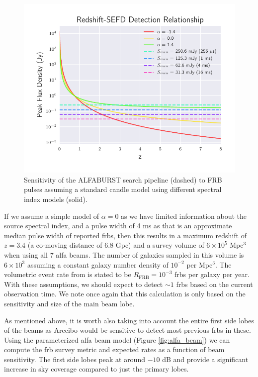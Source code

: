\documentclass[a4paper,fleqn,usenatbib]{mnras}
\begin{document}
\begin{figure}
    \includegraphics[width=1.0\linewidth]{figures/fwhm_sefd_z_relation.pdf}
    \caption{Sensitivity of the ALFABURST search pipeline (dashed) to FRB pulses
    assuming a standard candle model using different spectral index models
    (solid).
    }
    \label{fig:fwhm_sefd_z}
\end{figure}

If we assume a simple model of $\alpha=0$ as we have limited
information about the source spectral index, and a pulse width of 4 ms
as that is an approximate median pulse width of reported \glspl{frb},
then this results in a maximum redshift of $z=3.4$ (a co-moving
distance of 6.8 Gpc) and a survey volume of $6 \times 10^5$ Mpc$^3$
when using all 7 \gls{alfa} beams. The number of galaxies sampled in
this volume is $6 \times 10^3$ assuming a constant galaxy number
density of $10^{-2}$ per Mpc$^3$.  The volumetric event rate from
\cite{2013Sci...341...53T} is stated to be $R_{\textrm{FRB}} =
10^{-3}$ \glspl{frb} per galaxy per year. With these assumptions, we
should expect to detect $\sim 1$ \glspl{frb} based on the current
observation time. We note once again that this calculation is only
based on the sensitivity and size of the main beam lobe.

As mentioned above, it is worth also taking into account the entire
first side lobes of the beams as Arecibo would be sensitive to detect
most previous \glspl{frb} in these. Using the parameterized \gls{alfa}
beam model (Figure \ref{fig:alfa_beam}) \citep{GALFAbeam} we can
compute the \gls{frb} survey metric and expected rates as a function
of beam sensitivity.  The first side lobes peak at around $-10$ dB and
provide a significant increase in sky coverage compared to just the
primary lobes.
\end{document}
